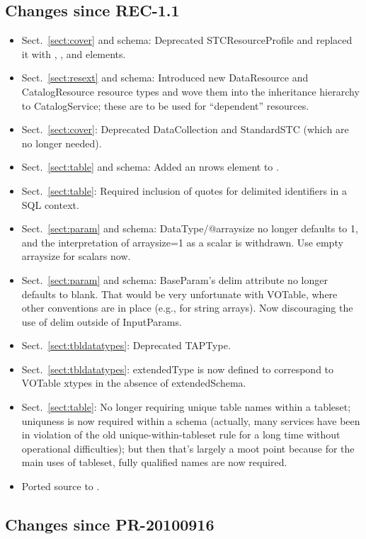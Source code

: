 \documentclass[11pt,a4paper]{ivoa}
\begin{document}
\subsection{Changes since REC-1.1}

\begin{itemize}
\item Sect.~\ref{sect:cover} and schema: Deprecated STCResourceProfile and replaced it with
, , and  elements.
\item Sect.~\ref{sect:resext} and schema: 
Introduced new DataResource and CatalogResource resource types
and wove them into the inheritance hierarchy to CatalogService; these
are to be used for ``dependent'' resources.
\item Sect.~\ref{sect:cover}:
Deprecated DataCollection and StandardSTC (which are no longer
needed).
\item Sect.~\ref{sect:table} 
and schema: Added an nrows element to .
\item Sect.~\ref{sect:table}: 
Required inclusion of quotes for delimited identifiers in a
SQL context.
\item Sect.~\ref{sect:param} and schema: 
DataType/@arraysize no longer defaults to 1, and the
interpretation of arraysize=1 as a scalar is withdrawn.  Use empty
arraysize for scalars now.
\item Sect.~\ref{sect:param} and schema:
BaseParam's delim attribute no longer defaults to blank.  That
would be very unfortunate with VOTable, where other conventions are in
place (e.g., for string arrays).  Now discouraging the use of delim
outside of InputParams.
\item Sect.~\ref{sect:tbldatatypes}: Deprecated TAPType.
\item Sect.~\ref{sect:tbldatatypes}: 
extendedType is now defined to correspond to VOTable xtypes in the
absence of extendedSchema.
\item Sect.~\ref{sect:table}: 
No longer requiring unique table names within a tableset;
uniquness is now required within a schema (actually, many services have
been in violation of the old unique-within-tableset rule for a long time
without operational difficulties); but then that's largely a moot point
because for the main uses of tableset, fully qualified names are now
required.
\item Ported source to \ivoatex.
\end{itemize}

\subsection{Changes since PR-20100916}
\end{document}
